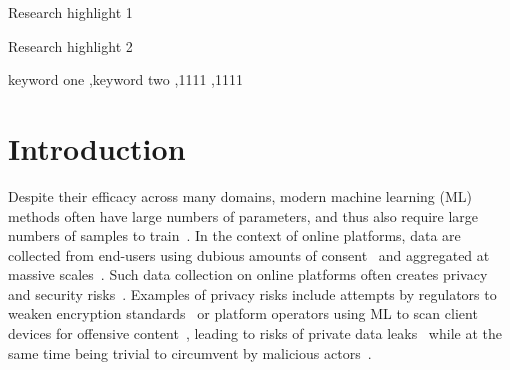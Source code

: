 \documentclass[preprint,12pt]{elsarticle}
\begin{document}
\begin{frontmatter}
\begin{highlights}
\item Research highlight 1
\item Research highlight 2
\end{highlights}

\begin{keyword}
keyword one \sep keyword two
 \sep 1111
 \sep 1111
\end{keyword}

\end{frontmatter}

\linenumbers

\section{Introduction}

Despite their efficacy across many domains, modern machine learning (ML) methods often have large numbers of parameters, and thus also require large numbers of samples to train~\cite{desislavov2021compute}.
In the context of online platforms, data are collected from end-users using dubious amounts of consent~\cite{nouwens2020dark} and aggregated at massive scales~\cite{desislavov2021compute}.
Such data collection on online platforms often creates privacy and security risks~\cite{chakraborty_adversarial_2018,meyers}.
Examples of privacy risks include attempts by regulators to weaken encryption standards~\cite{amnesty_encryption} or platform operators using ML to scan client devices for offensive content~\cite{chat_control}, leading to risks of private data leaks~\cite{xiao2021improving,fredrikson_model_2015} while at the same time being trivial to circumvent by malicious actors~\cite{carlini_towards_2017,dohmatob_generalized_2019,hopskipjump,biggio_evasion_2013,meyers,chakraborty_adversarial_2018,trashfire}.
\end{document}
